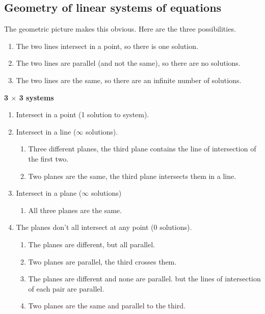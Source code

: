 \documentclass{article}
\begin{document}
\subsection{Geometry of linear systems of equations}

The geometric picture makes this obvious. Here are the three possibilities.
\begin{enumerate}
  \item The two lines intersect in a point, so there is one solution.
  \item The two lines are parallel (and not the same), so there are no solutions.
  \item The two lines are the same, so there are an infinite number of solutions.
\end{enumerate}

\textbf{3 $\times$ 3 systems}
\begin{enumerate}
  \item Intersect in a point (1 solution to system).
  \item Intersect in a line ($\infty$ solutions).
        \begin{enumerate}
          \item Three different planes, the third plane contains the line of intersection of the first two.
          \item Two planes are the same, the third plane intersects them in a line.
        \end{enumerate}
  \item Intersect in a plane ($\infty$ solutions)
        \begin{enumerate}
          \item All three planes are the same.
        \end{enumerate}
  \item The planes don’t all intersect at any point (0 solutions).
        \begin{enumerate}
          \item The planes are different, but all parallel.
          \item Two planes are parallel, the third crosses them.
          \item The planes are different and none are parallel. but the lines of intersection of each pair are parallel.
          \item Two planes are the same and parallel to the third.
        \end{enumerate}
\end{enumerate}
\end{document}
